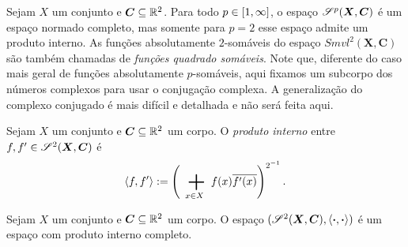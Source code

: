 Sejam $X$ um conjunto e $\bm C \subseteq \mathbb{R}^2$. Para todo $p \in \left[1,\allowbreak \infty\right]$, o espaço $\mathscr{S}^p(\bm X,\bm C)$ é um espaço normado completo, mas somente para $p=2$ esse espaço admite um produto interno. As funções absolutamente $2$-somáveis do espaço $Smvl^2(\bm X,\bm C)$ são também chamadas de \emph{funções quadrado somáveis}. Note que, diferente do caso mais geral de funções absolutamente $p$-somáveis, aqui fixamos um subcorpo dos números complexos para usar o conjugação complexa. A generalização do complexo conjugado é mais difícil e detalhada e não será feita aqui.

\begin{definition}
Sejam $X$ um conjunto e $\bm C \subseteq \mathbb{R}^2$ um corpo. O \emph{produto interno} entre $f,f' \in \mathscr{S}^2(\bm X,\bm C)$ é
	\begin{equation*}
	\inte{f}{f'} := \left( \sum_{x \in X} f(x)\overline{f'(x)} \right)^{2\inv}.
	\end{equation*}
\end{definition}

\begin{proposition}
Sejam $X$ um conjunto e $\bm C \subseteq \mathbb{R}^2$ um corpo. O espaço $(\mathscr{S}^2(\bm X,\bm C),\left\langle{\bm{\cdot}},{\bm{\cdot}}\right\rangle)$ é um espaço com produto interno completo.
\end{proposition}